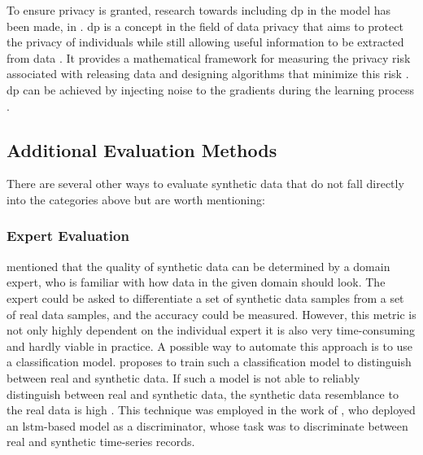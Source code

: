 To ensure privacy is granted, research towards including \gls{dp} \cite{dwork2008DifferentialPrivacySurvey} in the \gls{model} has been made, \eg in \cite{xie2018DifferentiallyPrivateGenerative, jordon2018PATEGANGeneratingSynthetic, torfi2022DifferentiallyPrivateSynthetic}.
\gls{dp} is a concept in the field of data privacy that aims to protect the privacy of individuals while still allowing useful information to be extracted from data \cite{dwork2008DifferentialPrivacySurvey}. 
It provides a mathematical framework for measuring the privacy risk associated with releasing data and designing algorithms that minimize this risk \cite{dwork2008DifferentialPrivacySurvey, zhao2022CTABGANEnhancingTabular}.
\gls{dp} can be achieved by injecting noise to the gradients during the learning process \cite{xie2018DifferentiallyPrivateGenerative}.

\subsection{Additional Evaluation Methods}
\label{ch:preliminaries-evaluationOfSyntheticTabularData-otherMetrics}

There are several other ways to evaluate synthetic data that do not fall directly into the categories above but are worth mentioning:

\subsubsection{Expert Evaluation}  
\textcite{elemam2020SevenWaysEvaluate} mentioned that the quality of synthetic data can be determined by a domain expert, 
who is familiar with how data in the given domain should look.
The expert could be asked to differentiate a set of synthetic data samples from a set of real data samples, and the accuracy could be measured.
However, this metric is not only highly dependent on the individual expert it is also very time-consuming and hardly viable in practice.
A possible way to automate this approach is to use a classification \gls{model}.
\textcite{elemam2020SevenWaysEvaluate} proposes to train such a classification \gls{model} to distinguish between real and synthetic data.
If such a \gls{model} is not able to reliably distinguish between real and synthetic data, the synthetic data resemblance to the real data is high \textcite[p. 57]{elemam2020SevenWaysEvaluate}.
This technique was employed in the work of \textcite{alzantot2017SenseGenDeepLearning}, who deployed an \gls{lstm}-based \gls{model} as a discriminator, whose task was to discriminate between real and synthetic time-series records.

